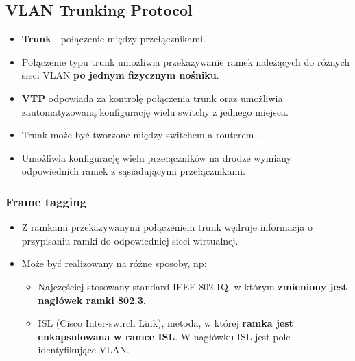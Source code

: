 \documentclass[../sk-egzamin.tex]{subfiles}
\begin{document}
\subsection*{VLAN Trunking Protocol}
\begin{itemize}
    \item \textbf{Trunk} - połączenie między przełącznikami.

    \item Połączenie typu trunk umożliwia przekazywanie ramek należących do
    różnych sieci VLAN \textbf{po jednym fizycznym nośniku}.

    \item \textbf{VTP} odpowiada za kontrolę połączenia trunk
    oraz umożliwia zautomatyzowaną konfigurację wielu switchy z jednego miejsca.

    \item Trunk może być tworzone między switchem a routerem
    .

    \item Umożliwia konfigurację wielu przełączników na drodze wymiany
    odpowiednich ramek z sąsiadującymi przełącznikami.
\end{itemize}

\subsubsection*{Frame tagging}
\begin{itemize}
    \item Z ramkami przekazywanymi połączeniem trunk wędruje informacja o
    przypisaniu ramki do odpowiedniej sieci wirtualnej.
    \item Może być realizowany na różne sposoby, np:
    \begin{itemize}
        \item Najczęściej stosowany standard IEEE 802.1Q, w którym
        \textbf{zmieniony jest nagłówek ramki 802.3}.

        \item ISL (Cisco Inter-swirch Link),  metoda,
        w której \textbf{ramka jest enkapsulowana w ramce ISL}.
        W nagłówku ISL jest pole identyfikujące VLAN.
    \end{itemize}
\end{itemize}
\end{document}
